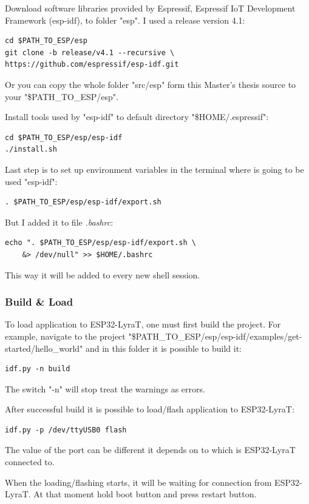 \documentclass[thesis=M,english]{FITthesis}[2019/12/23]
\begin{document}
\bigskip
\noindent
Download software libraries provided by Espressif, Espressif IoT Development Framework (esp-idf), to folder "esp". I used a release version 4.1:
\begin{lstlisting}[frame=single]
cd $PATH_TO_ESP/esp
git clone -b release/v4.1 --recursive \
https://github.com/espressif/esp-idf.git
\end{lstlisting}
Or you can copy the whole folder "src/esp" form this Master's thesis source to your "\$PATH\_TO\_ESP/esp".

\bigskip
\noindent
Install tools used by "esp-idf" to default directory "\$HOME/.espressif":
\begin{lstlisting}[frame=single]
cd $PATH_TO_ESP/esp/esp-idf
./install.sh
\end{lstlisting}

\bigskip
\noindent
Last step is to set up environment variables in the terminal where is going to be used "esp-idf":
\begin{lstlisting}[frame=single]
. $PATH_TO_ESP/esp/esp-idf/export.sh
\end{lstlisting}
But I added it to file \textit{.bashrc}:
\begin{lstlisting}[frame=single]
echo ". $PATH_TO_ESP/esp/esp-idf/export.sh \
	&> /dev/null" >> $HOME/.bashrc
\end{lstlisting}
This way it will be added to every new shell session.

\subsubsection{Build \& Load}
To load application to ESP32-LyraT, one must first build the project. For example, navigate to the project "\$PATH\_TO\_ESP/esp/esp-idf/examples/get-started/hello\_world" and in this folder it is possible to build it:
\begin{lstlisting}[frame=single]
idf.py -n build
\end{lstlisting}
The switch "-n" will stop treat the warnings as errors.

\bigskip
\noindent
After successful build it is possible to load/flash application to ESP32-LyraT:
\begin{lstlisting}[frame=single]
idf.py -p /dev/ttyUSB0 flash
\end{lstlisting}
The value of the port can be different it depends on to which is ESP32-LyraT connected to.

\bigskip
\noindent
When the loading/flashing starts, it will be waiting for connection from ESP32-LyraT. At that moment hold boot button and press restart button.
\end{document}

